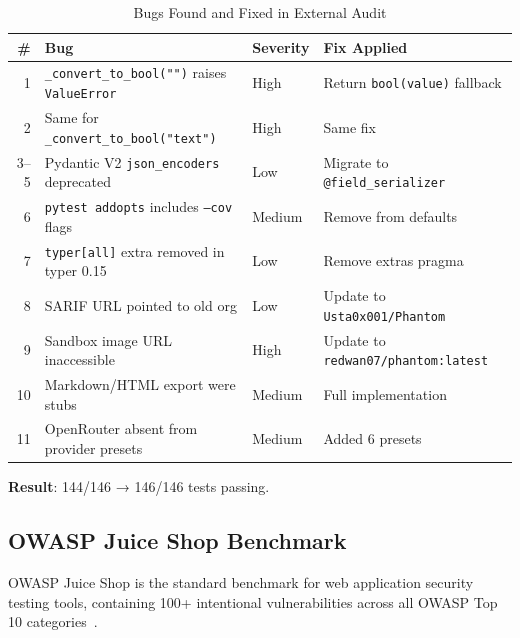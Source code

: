 \documentclass[12pt,a4paper]{article}
\begin{document}
\begin{table}[H]
\centering
\caption{Bugs Found and Fixed in External Audit}
\begin{tabular}{rp{5cm}lp{4.5cm}}
\toprule
\textbf{\#} & \textbf{Bug} & \textbf{Severity} & \textbf{Fix Applied} \\
\midrule
1 & \texttt{\_convert\_to\_bool("")} raises \texttt{ValueError} & High & Return \texttt{bool(value)} fallback \\
2 & Same for \texttt{\_convert\_to\_bool("text")} & High & Same fix \\
3--5 & Pydantic V2 \texttt{json\_encoders} deprecated & Low & Migrate to \texttt{@field\_serializer} \\
6 & \texttt{pytest addopts} includes \texttt{--cov} flags & Medium & Remove from defaults \\
7 & \texttt{typer[all]} extra removed in typer 0.15 & Low & Remove extras pragma \\
8 & SARIF URL pointed to old org & Low & Update to \texttt{Usta0x001/Phantom} \\
9 & Sandbox image URL inaccessible & High & Update to \texttt{redwan07/phantom:latest} \\
10 & Markdown/HTML export were stubs & Medium & Full implementation \\
11 & OpenRouter absent from provider presets & Medium & Added 6 presets \\
\bottomrule
\end{tabular}
\end{table}

\noindent\textbf{Result}: 144/146 → 146/146 tests passing.

\subsection{OWASP Juice Shop Benchmark}

OWASP Juice Shop is the standard benchmark for web application security testing tools, containing 100+ intentional vulnerabilities across all OWASP Top 10 categories~\cite{juiceshop}.
\end{document}
